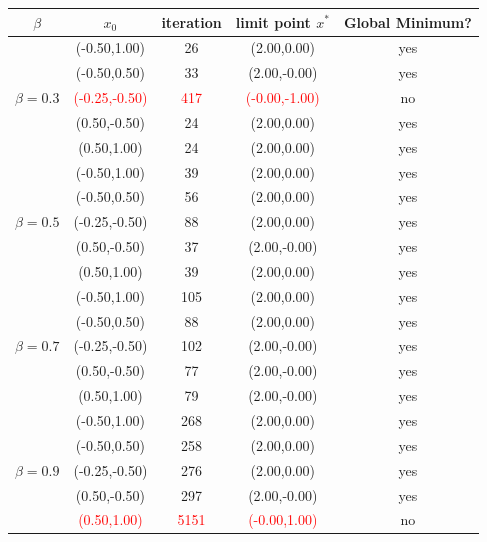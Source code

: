 \documentclass{article}
\begin{document}
\begin{center}
  \begin{tabular}{|c|cccc|} 
      \hline
      $\beta$ & $x_0$ & iteration & limit point $x^*$ & Global Minimum? \\
      \hline
      &(-0.50,1.00) & 26 & (2.00,0.00) & yes\\ %
      &(-0.50,0.50) & 33 & (2.00,-0.00) & yes \\ %
      $\beta = 0.3$&\textcolor{red}{(-0.25,-0.50)} & \textcolor{red}{417} & \textcolor{red}{(-0.00,-1.00)} & no \\ %
      &(0.50,-0.50) & 24 & (2.00,0.00) & yes \\ %
      &(0.50,1.00) & 24 & (2.00,0.00) & yes \\ %
      \hline
      \hline
      &(-0.50,1.00) & 39 & (2.00,0.00) & yes \\ %
      &(-0.50,0.50) & 56 & (2.00,0.00) & yes \\ %
      $\beta = 0.5$&(-0.25,-0.50) & 88 & (2.00,0.00) & yes \\ %
      &(0.50,-0.50) & 37 & (2.00,-0.00) & yes \\ %
      &(0.50,1.00) & 39 & (2.00,0.00) & yes \\ %
      \hline
      \hline
      &(-0.50,1.00) & 105 & (2.00,0.00) & yes \\ %
      &(-0.50,0.50) & 88 & (2.00,0.00) & yes \\ %
      $\beta = 0.7$&(-0.25,-0.50) & 102 & (2.00,-0.00) & yes \\ %
      &(0.50,-0.50) & 77 & (2.00,-0.00) & yes \\ %
      &(0.50,1.00) & 79 & (2.00,-0.00) & yes \\ %
    \hline
    \hline
    &(-0.50,1.00) & 268 & (2.00,0.00) & yes \\ %
    &(-0.50,0.50)& 258 & (2.00,0.00) & yes \\ %
    $\beta = 0.9$&(-0.25,-0.50) & 276 & (2.00,0.00) & yes \\ %
    &(0.50,-0.50) & 297 & (2.00,-0.00) & yes \\ %
    &\textcolor{red}{(0.50,1.00)} & \textcolor{red}{5151} & \textcolor{red}{(-0.00,1.00)} & no \\ %
    \hline
  \end{tabular} 
\end{center}
\end{document}

